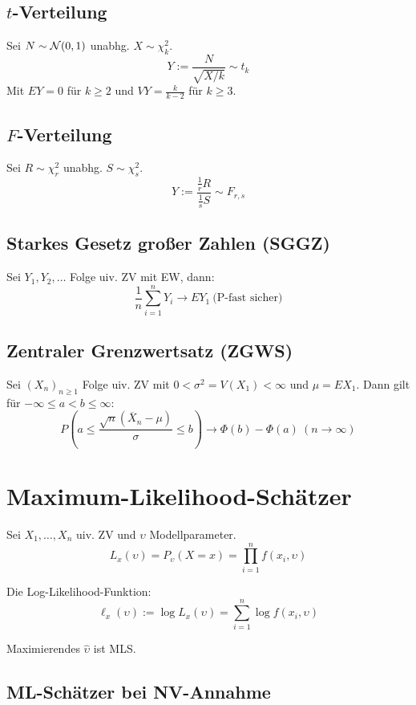 \subsection*{\(t\)-Verteilung}

Sei \(N \sim \mathcal{N}(0,1)\) unabhg. \(X \sim \chi_k^2\).
\[ Y := \frac{N}{\sqrt{X/k}} \sim t_k \]
Mit \(EY = 0\) für \(k \geq 2\) und \(VY=\frac{k}{k-2}\) für \(k \geq 3\).

\subsection*{\(F\)-Verteilung}

Sei \(R \sim \chi_r^2\) unabhg. \(S \sim \chi_s^2\).
\[ Y:= \frac{\frac{1}{r} R}{\frac{1}{s} S} \sim F_{r,s} \]

\subsection*{Starkes Gesetz großer Zahlen (SGGZ)}

Sei \(Y_1,Y_2,\dots\) Folge uiv. ZV mit EW, dann:
\[ \frac{1}{n} \sum_{i=1}^n Y_i \to EY_1 \ \text{(P-fast sicher)} \]

\subsection*{Zentraler Grenzwertsatz (ZGWS)}

Sei \((X_n)_{n\geq1}\) Folge uiv. ZV mit \(0 < \sigma^2 = V(X_1) < \infty\) und \(\mu = EX_1\). Dann gilt für \(-\infty \leq a < b \leq \infty\):
\[ P\left( a \leq \frac{\sqrt{n}(\overline X_n - \mu)}{\sigma} \leq b \right) \to \Phi(b) - \Phi(a) \ (n \to \infty) \]

\section*{Maximum-Likelihood-Schätzer}

Sei \(X_1, \dots, X_n\) uiv. ZV und \(\upsilon\) Modellparameter.
\[ L_x(\upsilon) = P_\upsilon(X=x) = \prod_{i=1}^n f(x_i, \upsilon) \]

Die Log-Likelihood-Funktion:
\[ \ell_x(\upsilon) := \log L_x(\upsilon) = \sum_{i=1}^n \log f(x_i, \upsilon) \]

Maximierendes \(\hat\upsilon\) ist MLS.

\subsection*{ML-Schätzer bei NV-Annahme}

